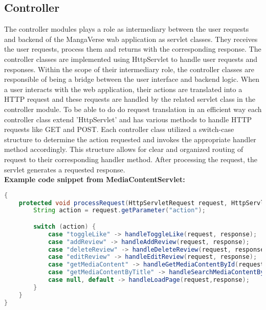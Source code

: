\subsection*{Controller}
The controller modules plays a role as intermediary between the user requests and backend of the MangaVerse wab application as servlet classes.
They receives the user requests, process them and returns with the corresponding response. The controller classes are implemented using HttpServlet to handle user requests and responses.
Within the scope of their intermediary role, the controller classes are responsible of being a bridge between the user interface and backend logic. 
When a user interacts with the web application, their actions are translated into a HTTP request and these requests are handled by the related servlet class in the controller module. 
To be able to do do request translation in an efficient way each controller class extend 'HttpServlet' and has various methods to handle HTTP requests like GET and POST. 
Each controller class utilized a switch-case structure to determine the action requested and invokes the appropriate handler method accordingly.
This structure allows for clear and organized routing of request to their corresponding handler method. After processing the request, the servlet generates a requested response.\\
\newline
\textbf{Example code snippet from MediaContentServlet:}
\begin{mdframed}[backgroundcolor=yellow!20, innerleftmargin=10pt, innerrightmargin=10pt]
    \begin{lstlisting}[language=java]
{
    protected void processRequest(HttpServletRequest request, HttpServletResponse response) throws ServletException, IOException {
        String action = request.getParameter("action");

        switch (action) {
            case "toggleLike" -> handleToggleLike(request, response);
            case "addReview" -> handleAddReview(request, response);
            case "deleteReview" -> handleDeleteReview(request, response);
            case "editReview" -> handleEditReview(request, response);
            case "getMediaContent" -> handleGetMediaContentById(request,response);
            case "getMediaContentByTitle" -> handleSearchMediaContentByTitle(request,response);
            case null, default -> handleLoadPage(request,response);
        }
    }
}
    \end{lstlisting}
\end{mdframed}
